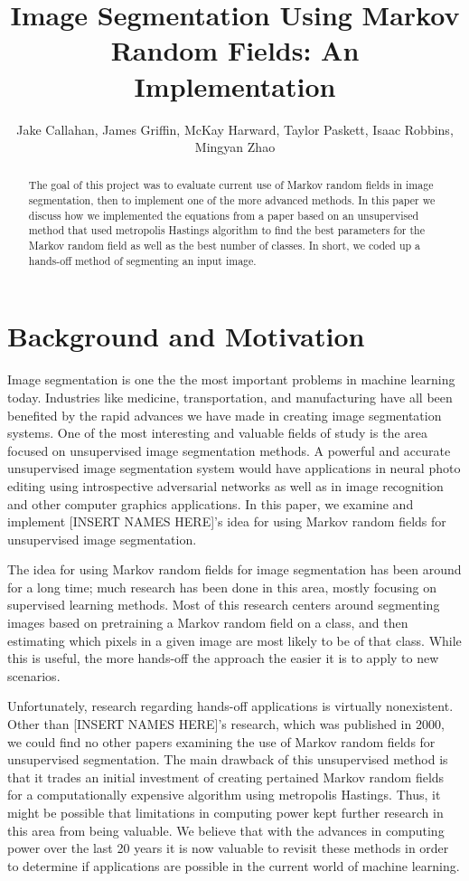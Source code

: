 \documentclass[11pt]{article}
\title{Image Segmentation Using Markov Random Fields: An Implementation}
\author{Jake Callahan, James Griffin, McKay Harward, Taylor Paskett, Isaac Robbins, Mingyan Zhao}
\begin{document}
\maketitle

\begin{abstract}
The goal of this project was to evaluate current use of Markov random fields in image segmentation, then to implement one of the more advanced methods. In this paper we discuss how we implemented the equations from a paper based on an unsupervised method that used metropolis Hastings algorithm to find the best parameters for the Markov random field as well as the best number of classes. In short, we coded up a hands-off method of segmenting an input image.
\end{abstract}

\section{Background and Motivation}
Image segmentation is one the the most important problems in machine learning today. Industries like medicine, transportation, and manufacturing have all been benefited by the rapid advances we have made in creating image segmentation systems. 
One of the most interesting and valuable fields of study is the area focused on unsupervised image segmentation methods. 
A powerful and accurate unsupervised image segmentation system would have applications in neural photo editing using introspective adversarial networks as well as in image recognition and other computer graphics applications. In this paper, we examine and implement [INSERT NAMES HERE]'s idea for using Markov random fields for unsupervised image segmentation.

 The idea for using Markov random fields for image segmentation has been around for a long time; much research has been done in this area, mostly focusing on supervised learning methods. Most of this research centers around segmenting images based on pretraining a Markov random field on a class, and then estimating which pixels in a given image are most likely to be of that class. While this is useful, the more hands-off the approach the easier it is to apply to new scenarios. 
 
 Unfortunately, research regarding hands-off applications is virtually nonexistent. 
 Other than [INSERT NAMES HERE]'s research, which was published in 2000, we could find no other papers examining the use of Markov random fields for unsupervised segmentation. 
 The main drawback of this unsupervised method is that it trades an initial investment of creating pertained Markov random fields for a computationally expensive algorithm using metropolis Hastings.
 Thus, it might be possible that limitations in computing power kept further research in this area from being valuable.
 We believe that with the advances in computing power over the last 20 years it is now valuable to revisit these methods in order to determine if applications are possible in the current world of machine learning.
\end{document}
